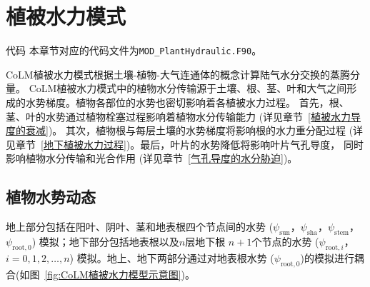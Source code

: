 \chapter{植被水力模式}
\begin{mymdframed}{代码}
  本章节对应的代码文件为\texttt{MOD\_PlantHydraulic.F90}。
\end{mymdframed}

CoLM植被水力模式根据土壤-植物-大气连通体的概念计算陆气水分交换的蒸腾分量。
CoLM植被水力模式中的植物水分传输源于土壤、根、茎、叶和大气之间形成的水势梯度。植物各部位的水势也密切影响着各植被水力过程。
首先，根、茎、叶的水势通过植物栓塞过程影响着植物水分传输能力 (详见章节~\ref{植被水力导度的衰减})。
其次，植物根与每层土壤的水势梯度将影响根的水力重分配过程 (详见章节~\ref{地下植被水力过程})。最后，叶片的水势降低将影响叶片气孔导度，
同时影响植物水分传输和光合作用 (详见章节~\ref{气孔导度的水分胁迫})。


\section{植物水势动态}\label{植物水势动态}
地上部分包括在阳叶、阴叶、茎和地表根四个节点间的水势 ($\psi_{\mathrm{sun}}$，$\psi_{\mathrm{sha}}$，$\psi_{\mathrm{stem}}$，$\psi_{\mathrm{root,0}}$)
%
模拟；地下部分包括地表根以及$n$层地下根 $n+1$个节点的水势 ($\psi_{\mathrm{root},i}$，$i=0,1,2,\ldots,n$) 模拟。地上、地下两部分通过对地表根水势
($\psi_{\mathrm{root,0}}$)的模拟进行耦合(如图~\ref{fig:CoLM植被水力模型示意图})。

